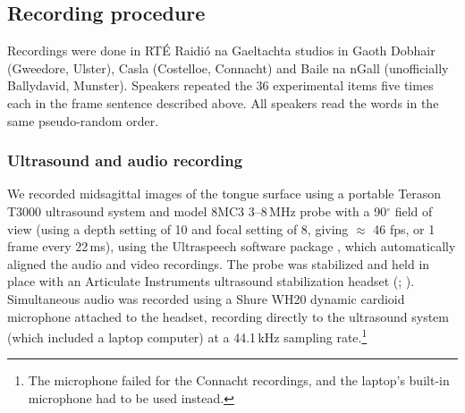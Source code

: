 \documentclass[output=paper,colorlinks,citecolor=brown]{langscibook}
\begin{document}


\subsection{Recording procedure}
Recordings were done in RT\'E Raidi\'o na Gaeltachta studios in Gaoth Dobhair (Gweedore, Ulster), Casla (Costelloe, Connacht) and Baile na nGall (unofficially Ballydavid, Munster). Speakers repeated the 36 experimental items five times each in the frame sentence described above. All speakers read the words in the same pseudo-random order. 

\subsubsection{Ultrasound and audio recording}
We recorded midsagittal images of the tongue surface using a portable Terason T3000 ultrasound system and model 8MC3 3--8\,MHz probe with a 90$^{\circ}$ field of view (using a depth setting of 10 and focal setting of 8, giving $\approx$ 46 fps, or 1 frame every 22\,ms), using the Ultraspeech software package \citep{Hueber_etal:08}, which automatically aligned the audio and video recordings. The probe was stabilized and held in place with an Articulate Instruments ultrasound stabilization headset (\cite{Wrench2008_stabilization_headset_manual}; \cite{Scobbie_etal_2008_head_movt}). Simultaneous audio was recorded using a Shure WH20 dynamic cardioid microphone attached to the headset, recording directly to the  ultrasound system (which included a laptop computer) at a 44.1\,kHz sampling rate.\footnote{The microphone failed for the Connacht recordings, and the laptop's built-in microphone had to be used instead.}
\end{document}

